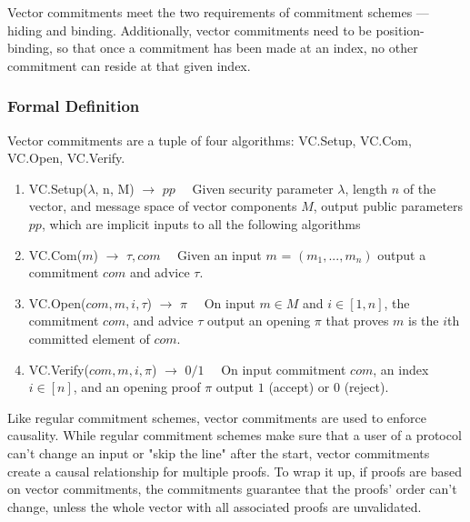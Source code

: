Vector commitments meet the two requirements of commitment schemes --- hiding and binding. Additionally, vector commitments need to be position-binding, so that once a commitment has been made at an index, no other commitment can reside at that given index.

\subsubsection{Formal Definition}
Vector commitments are a tuple of four algorithms: VC.Setup, VC.Com, VC.Open, VC.Verify.~\cite{Boneh2019-tk}

\begin{enumerate}

  \item VC.Setup(\(\lambda\), n, M) \(\rightarrow\) \(pp\quad\) Given security parameter \(\lambda\), length \(n\) of the vector, and message space of vector components \(M\), output public parameters \(pp\), which are implicit inputs to all the following algorithms

  \item VC.Com(\(m\)) \(\rightarrow\) \(\tau, com\quad\) Given an input \(m\) = \((m_1, ..., m_n)\) output a commitment \(com\) and advice \(\tau\).

  \item VC.Open(\(com, m, i, \tau\)) \(\rightarrow\) \(\pi\quad\) On input \(m \in M\) and \(i \in [1, n]\), the commitment \(com\), and advice \(\tau\) output an opening \(\pi\) that proves \(m\) is the \(i\)th committed element of \(com\).

  \item VC.Verify(\(com, m, i, \pi\)) \(\rightarrow\) \(0/1\quad\) On input commitment \(com\), an index \(i \in [n]\), and an opening proof \(\pi\) output \(1\) (accept) or \(0\) (reject).

\end{enumerate}

Like regular commitment schemes, vector commitments are used to enforce causality. While regular commitment schemes make sure that a user of a protocol can't change an input or "skip the line" after the start, vector commitments create a causal relationship for multiple proofs. To wrap it up, if proofs are based on vector commitments, the commitments guarantee that the proofs' order can't change, unless the whole vector with all associated proofs are unvalidated.

